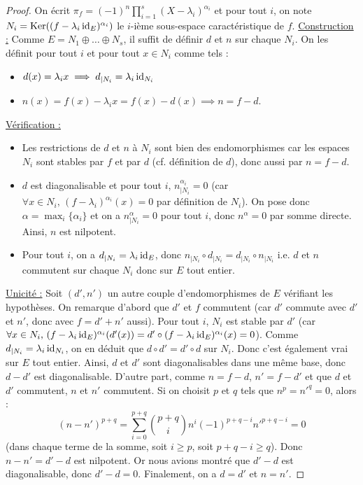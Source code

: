   \begin{proof}
    On écrit $\pi_f = (-1)^n \prod_{i=1}^s (X - \lambda_i)^{\alpha_i}$ et pour tout $i$, on note $N_i = \mathrm{Ker}((f-\lambda_i \operatorname{id}_E)^{\alpha_i})$ le $i$-ième sous-espace caractéristique de $f$.
    \newpar
    \uline{Construction :} Comme $E = N_1 \oplus \dots \oplus N_s$, il suffit de définir $d$ et $n$ sur chaque $N_i$. On les définit pour tout $i$ et pour tout $x \in N_i$ comme tels :
    \begin{itemize}
      \item $d(x) = \lambda_i x \implies d_{|N_i} = \lambda_i \operatorname{id}_{N_i}$
      \item $n(x) = f(x) - \lambda_i x = f(x) - d(x) \implies n = f - d$.
    \end{itemize}
    \medskip
    \uline{Vérification :}
    \begin{itemize}
      \item Les restrictions de $d$ et $n$ à $N_i$ sont bien des endomorphismes car les espaces $N_i$ sont stables par $f$ et par $d$ (cf. définition de $d$), donc aussi par $n = f - d$.
      \item $d$ est diagonalisable et pour tout $i$, $n_{|N_i}^{\alpha_i} = 0$ (car $\forall x \in N_i, \, (f-\lambda_i)^{\alpha_i}(x) = 0$ par définition de $N_i$). On pose donc $\alpha = \max_{i} \{ \alpha_i \}$ et on a $n_{|N_i}^\alpha = 0$ pour tout $i$, donc $n^\alpha = 0$ par somme directe. Ainsi, $n$ est nilpotent.
      \item Pour tout $i$, on a $d_{|N_i} = \lambda_i \operatorname{id}_E$, donc $n_{|N_i} \circ d_{|N_i} = d_{|N_i} \circ n_{|N_i}$ i.e. $d$ et $n$ commutent sur chaque $N_i$ donc sur $E$ tout entier.
    \end{itemize}
    \medskip
    \uline{Unicité :} Soit $(d', n')$ un autre couple d'endomorphismes de $E$ vérifiant les hypothèses. On remarque d'abord que $d'$ et $f$ commutent (car $d'$ commute avec $d'$ et $n'$, donc avec $f = d' + n'$ aussi). Pour tout $i$, $N_i$ est stable par $d'$ (car $\forall x \in N_i, \, (f-\lambda_i \operatorname{id}_E)^{\alpha_i}(d'(x)) = d' \circ (f-\lambda_i \operatorname{id}_E)^{\alpha_i}(x) = 0$). Comme $d_{|N_i} = \lambda_i \operatorname{id}_{N_i}$, on en déduit que $d \circ d' = d' \circ d$ sur $N_i$. Donc c'est également vrai sur $E$ tout entier. Ainsi, $d$ et $d'$ sont diagonalisables dans une même base, donc $d - d'$ est diagonalisable.
    \newpar
    D'autre part, comme $n = f-d$, $n' = f-d'$ et que $d$ et $d'$ commutent, $n$ et $n'$ commutent. Si on choisit $p$ et $q$ tels que $n^p = n'^q = 0$, alors :
    \[ (n-n')^{p+q} = \sum_{i=0}^{p+q} \binom{p+q}{i} n^{i} (-1)^{p+q-i} n'^{p+q-i} = 0 \]
    (dans chaque terme de la somme, soit $i \geq p$, soit $p+q-i \geq q$). Donc $n - n' = d' - d$ est nilpotent. Or nous avions montré que $d' - d$ est diagonalisable, donc $d'-d = 0$. Finalement, on a $d = d'$ et $n = n'$.
  \end{proof}

